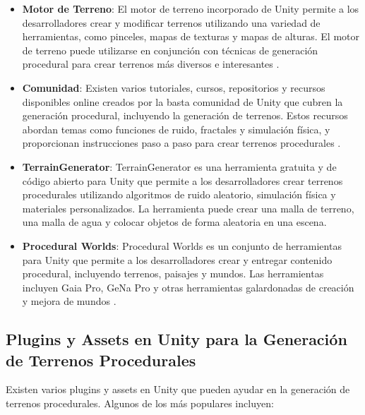 \begin{itemize}
    \item \textbf{Motor de Terreno}: El motor de terreno incorporado de Unity permite a los desarrolladores crear y modificar terrenos utilizando una variedad de herramientas, como pinceles, mapas de texturas y mapas de alturas. El motor de terreno puede utilizarse en conjunción con técnicas de generación procedural para crear terrenos más diversos e interesantes \cite{UnityTerrain}.
    
    \item \textbf{Comunidad}: Existen varios tutoriales, cursos, repositorios y recursos disponibles online creados por la basta comunidad de Unity que cubren la generación procedural, incluyendo la generación de terrenos. Estos recursos abordan temas como funciones de ruido, fractales y simulación física, y proporcionan instrucciones paso a paso para crear terrenos procedurales .
    
    \item \textbf{TerrainGenerator}: TerrainGenerator es una herramienta gratuita y de código abierto para Unity que permite a los desarrolladores crear terrenos procedurales utilizando algoritmos de ruido aleatorio, simulación física y materiales personalizados. La herramienta puede crear una malla de terreno, una malla de agua y colocar objetos de forma aleatoria en una escena\cite{TerrainGenerator}.
    
    \item \textbf{Procedural Worlds}: Procedural Worlds es un conjunto de herramientas para Unity que permite a los desarrolladores crear y entregar contenido procedural, incluyendo terrenos, paisajes y mundos. Las herramientas incluyen Gaia Pro, GeNa Pro y otras herramientas galardonadas de creación y mejora de mundos \cite{ProceduralWorlds}.
    
\end{itemize}

\subsection{Plugins y Assets en Unity para la Generación de Terrenos Procedurales}

Existen varios plugins y assets en Unity que pueden ayudar en la generación de terrenos procedurales. Algunos de los más populares incluyen:

